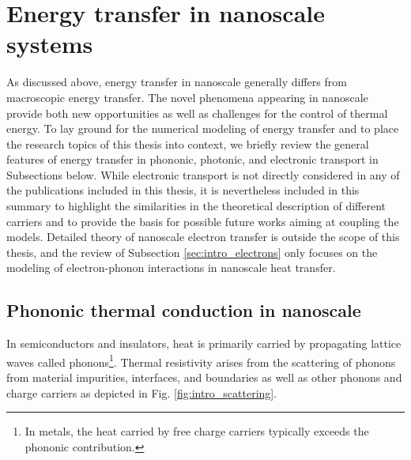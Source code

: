 \section{Energy transfer in nanoscale systems}

As discussed above, energy transfer in nanoscale generally differs from macroscopic energy transfer. The novel phenomena appearing in nanoscale provide both new opportunities as well as challenges for the control of thermal energy. To lay ground for the numerical modeling of energy transfer and to place the research topics of this thesis into context, we briefly review the general features of energy transfer in phononic, photonic, and electronic transport in Subsections below. While electronic transport is not directly considered in any of the publications included in this thesis, it is nevertheless included in this summary to highlight the similarities in the theoretical description of different carriers and to provide the basis for possible future works aiming at coupling the models. Detailed theory of nanoscale electron transfer is outside the scope of this thesis, and the review of Subsection \ref{sec:intro_electrons} only focuses on the modeling of electron-phonon interactions in nanoscale heat transfer. 

\subsection{Phononic thermal conduction in nanoscale}
\label{sec:intro_vib}

In semiconductors and insulators, heat is primarily carried by propagating lattice waves called phonons\footnote{In metals, the heat carried by free charge carriers typically exceeds the phononic contribution.}. Thermal resistivity arises from the scattering of phonons from material impurities, interfaces, and boundaries as well as other phonons and charge carriers \cite{peierls29,ziman} as depicted in Fig. \ref{fig:intro_scattering}. 

